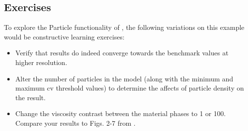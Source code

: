 \subsection{Exercises}
To explore the Particle functionality of \fluidity, the following variations on this example would be constructive learning exercises:
\begin{itemize}
\item Verify that results do indeed converge towards the benchmark values at higher resolution.
\item Alter the number of particles in the model (along with the minimum and maximum cv threshold values) to determine the affects of particle density on the result.
\item Change the viscosity contrast between the material phases to 1 or 100. Compare your results to Figs. 2-7 from \citet{vankeken1997comparison}.
\end{itemize}

